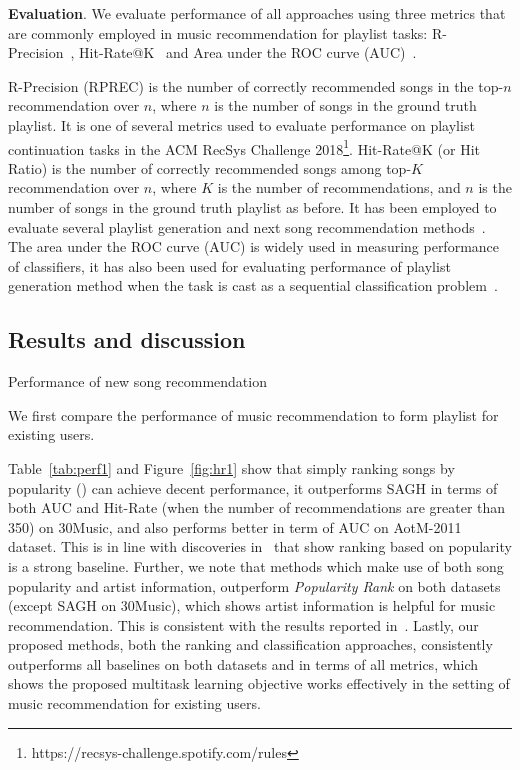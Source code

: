 {\bf Evaluation}.
We evaluate performance of all approaches using three metrics that are commonly employed in music recommendation for playlist tasks:
R-Precision~\cite{manning2008introIR}, Hit-Rate@K~\cite{hariri2012context} and Area under the ROC curve (AUC)~\cite{manning2008introIR}.

R-Precision (RPREC) is the number of correctly recommended songs in the top-$n$ recommendation over $n$,
where $n$ is the number of songs in the ground truth playlist.
It is one of several metrics used to evaluate performance on playlist continuation tasks
in the ACM RecSys Challenge 2018\footnote{https://recsys-challenge.spotify.com/rules}.
%
Hit-Rate@K (or Hit Ratio) is the number of correctly recommended songs among top-$K$ recommendation over $n$,
where $K$ is the number of recommendations, and $n$ is the number of songs in the ground truth playlist as before.
It has been employed to evaluate several playlist generation and next song recommendation
methods~\cite{hariri2012context,bonnin2013evaluating,bonnin2015automated,jannach2015beyond}.
%
The area under the ROC curve (AUC) is widely used in measuring performance of classifiers,
it has also been used for evaluating performance of playlist generation method when the task
is cast as a sequential classification problem~\cite{ben2017groove}.


\subsection{Results and discussion}

\begin{table}[t]
\centering
\caption{Performance of new song recommendation}
\label{tab:nsr}
\resizebox{\columnwidth}{!}{

}
\end{table}



We first compare the performance of music recommendation to form playlist for existing users.

Table~\ref{tab:perf1} and Figure~\ref{fig:hr1} show that simply ranking songs by popularity ()
can achieve decent performance,
it outperforms SAGH in terms of both AUC and Hit-Rate (when the number of recommendations are greater than 350) on 30Music,
and also performs better in term of AUC on AotM-2011 dataset.
This is in line with discoveries in~\cite{bonnin2013evaluating,jannach2015beyond,bonnin2015automated} that show ranking based on
popularity is a strong baseline.
Further, we note that methods which make use of both song popularity and artist information,
outperform {\it Popularity Rank} on both datasets (except SAGH on 30Music), which shows artist information is helpful for music recommendation.
This is consistent with the results reported in~\cite{bonnin2013evaluating,bonnin2015automated}.
Lastly, our proposed methods, both the ranking and classification approaches, consistently outperforms all baselines
on both datasets and in terms of all metrics, which shows the proposed multitask learning objective works effectively
in the setting of music recommendation for existing users.

